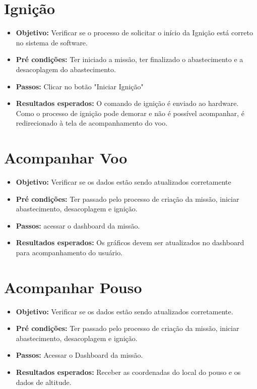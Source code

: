 \begin{apendicesenv}
\section{Ignição}
\begin{itemize} 
    \item \textbf{Objetivo:} Verificar se o processo de solicitar o início da Ignição está correto no sistema de software.
    \item \textbf{Pré condições:} Ter iniciado a missão, ter finalizado o abastecimento e a desacoplagem do abastecimento.
    \item \textbf{Passos:} Clicar no botão "Iniciar Ignição"
    \item \textbf{Resultados esperados:} O comando de ignição é enviado ao hardware. Como o processo de ignição pode demorar e não é possível acompanhar, é redirecionado à tela de acompanhamento do voo.
\end{itemize}

\section{Acompanhar Voo}
\begin{itemize} 
    \item \textbf{Objetivo:} Verificar se os dados estão sendo atualizados corretamente
    \item \textbf{Pré condições:} Ter passado pelo processo de criação da missão, iniciar abastecimento, desacoplagem e ignição.
    \item \textbf{Passos:} acessar o dashboard da missão.
    \item \textbf{Resultados esperados:} Os gráficos devem ser atualizados no dashboard para acompanhamento do usuário.
\end{itemize}

\section{Acompanhar Pouso}
\begin{itemize} 
    \item \textbf{Objetivo:} Verificar se os dados estão sendo atualizados corretamente.
    \item \textbf{Pré condições:} Ter passado pelo processo de criação da missão, iniciar abastecimento, desacoplagem e ignição.
    \item \textbf{Passos:} Acessar o Dashboard da missão.
    \item \textbf{Resultados esperados:} Receber as coordenadas do local do pouso e os dados de altitude.
\end{itemize}


\end{apendicesenv}
